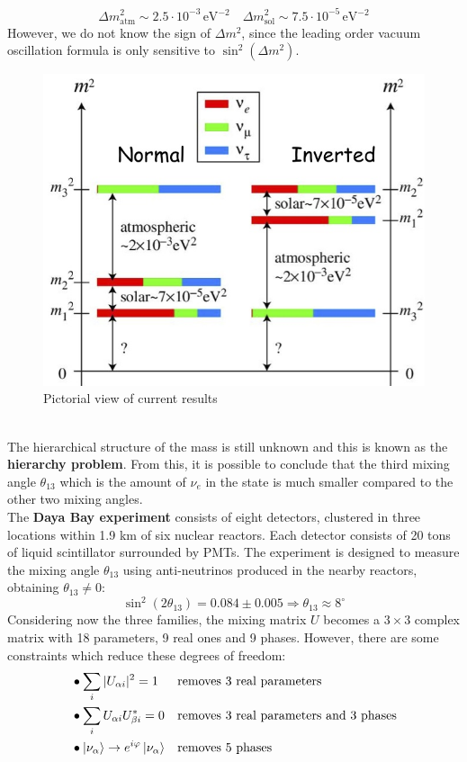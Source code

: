 \documentclass[10.75pt,a4paper,openright,bottom=2cm]{article}
\begin{document}
\[
\Delta m^2_{\text{atm}}\sim2.5\cdot10^{-3}\,\text{eV$^{-2}$} \quad \Delta m^2_{\text{sol}}\sim7.5\cdot10^{-5}\,\text{eV$^{-2}$}
\]
However, we do not know the sign of $\Delta m^2$, since the leading order vacuum oscillation formula is only sensitive to $\sin^2(\Delta m^2)$.
\begin{figure}[h]
    \centering
    \includegraphics{hierarchy.jpg}
    \caption{Pictorial view of current results}
    \label{hierarchy}
\end{figure}\\
\noindent
The hierarchical structure of the mass is still unknown and this is known as the \textbf{hierarchy problem}. From this, it is possible to conclude that the third mixing angle $\theta_{13}$ which is the amount of $\nu_e$ in the  state is much smaller compared to the other two mixing angles.\\
The \textbf{Daya Bay experiment} consists of eight detectors, clustered in three locations within 1.9 km of six nuclear reactors. Each detector consists of 20 tons of liquid scintillator surrounded by PMTs. The experiment is designed to measure the mixing angle $\theta_{13}$ using anti-neutrinos produced in the nearby reactors, obtaining $\theta_{13}\neq0$:
\[
\sin^2(2\theta_{13})=0.084\pm0.005\Rightarrow \theta_{13}\approx8^\circ
\]
Considering now the three families, the mixing matrix $U$ becomes a $3\times3$ complex matrix with 18 parameters, 9 real ones and 9 phases. However, there are some constraints which reduce these degrees of freedom:
\[
\begin{aligned}
&\bullet \sum_i|U_{\alpha i}|^2=1 &&\text{removes 3 real parameters}\\
&\bullet \sum_iU_{\alpha i}U_{\beta i}^*=0 &&\text{removes 3 real parameters and 3 phases}\\
&\bullet \ket{\nu_\alpha}\to e^{i\varphi}\ket{\nu_\alpha} &&\text{removes 5 phases}
\end{aligned}
\]
\end{document}
